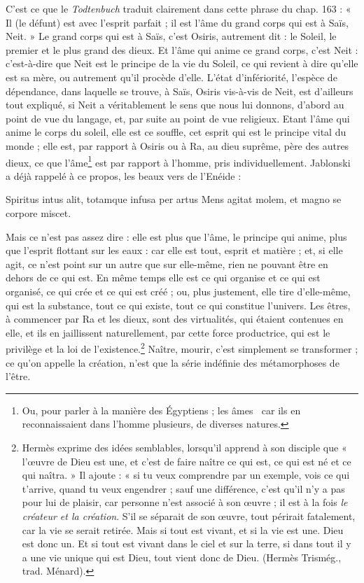 \documentclass[a4paper, 11pt, oneside]{article}
\newcommand*\hieroAAEF{}
\newcommand*\hieroABFX{}
\begin{document}
C'est ce que le \emph{Todtenbuch} traduit clairement dans cette phrase du chap. 163 : « Il (le défunt) est avec l'esprit parfait ; il est l'âme du grand corps qui est à Saïs, Neit. » Le grand corps qui est à Saïs, c'est Osiris, autrement dit : le Soleil, le premier et le plus grand des dieux. Et l'âme qui anime ce grand corps, c'est Neit : c'est-à-dire que Neit est le principe de la vie du Soleil, ce qui revient à dire qu'elle est sa mère, ou autrement qu'il procède d'elle. L'état d'infériorité, l'espèce de dépendance, dans laquelle se trouve, à Saïs, Osiris vis-à-vis de Neit, est d'ailleurs tout expliqué, si Neit a véritablement le sens que nous lui donnons, d'abord au point de vue du langage, et, par suite au point de vue religieux. Etant l'âme qui anime le corps du soleil, elle est ce souffle, cet esprit qui est le principe vital du monde ; elle est, par rapport à Osiris ou à Ra, au dieu suprême, père des autres dieux, ce que l'âme\footnote{Ou, pour parler à la manière des Égyptiens ; les âmes $\hieroABFX\:\hieroAAEF$ car ils en reconnaissaient dans l'homme plusieurs, de diverses natures.} est par rapport à l'homme, pris individuellement. Jablonski a déjà rappelé à ce propos, les beaux vers de l'Enéide :

Spiritus intus alit, totamque infusa per artus Mens agitat molem, et magno se corpore miscet.

Mais ce n'est pas assez dire : elle est plus que l'âme, le principe qui anime, plus que l'esprit flottant sur les eaux : car elle est tout, esprit et matière ; et, si elle agit, ce n'est point sur un autre que sur elle-même, rien ne pouvant être en dehors de ce qui est. En même temps elle est ce qui organise et ce qui est organisé, ce qui crée et ce qui est créé ; ou, plus justement, elle tire d'elle-même, qui est la substance, tout ce qui existe, tout ce qui constitue l'univers. Les êtres, à commencer par Ra et les dieux, sont des virtualités, qui étaient contenues en elle, et ils en jaillissent naturellement, par cette force productrice, qui est le privilège et la loi de l'existence.\footnote{Hermès exprime des idées semblables, lorsqu'il apprend à son disciple que « l'œuvre de Dieu est une, et c'est de faire naître ce qui est, ce qui est né et ce qui naîtra. » Il ajoute : « si tu veux comprendre par un exemple, vois ce qui t'arrive, quand tu veux engendrer ; sauf une différence, c'est qu'il n'y a pas pour lui de plaisir, car personne n'est associé à son œuvre ; il est à la fois \emph{le créateur et la création}. S'il se séparait de son œuvre, tout périrait fatalement, car la vie se serait retirée. Mais si tout est vivant, et si la vie est une. Dieu est donc un. Et si tout est vivant dans le ciel et sur la terre, si dans tout il y a une vie unique qui est Dieu, tout vient donc de Dieu. (Hermès Trismég., trad. Ménard).} Naître, mourir, c'est simplement se transformer ; ce qu'on appelle la création, n'est que la série indéfinie des métamorphoses de l'être.
\end{document}
